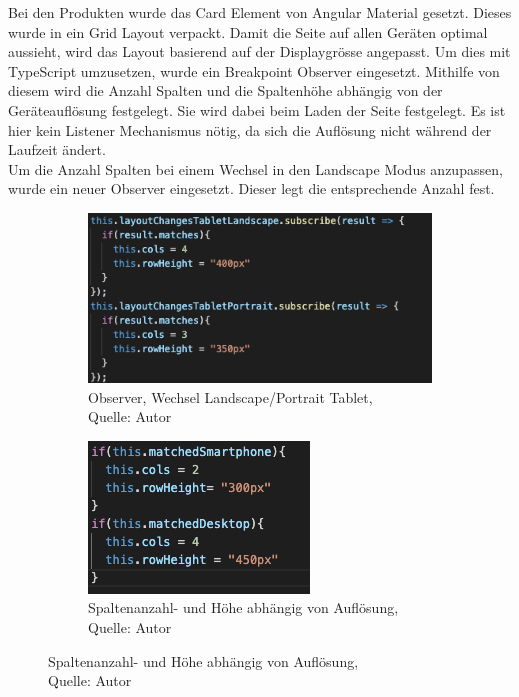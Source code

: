 Bei den Produkten wurde das Card Element von Angular Material gesetzt. Dieses wurde in ein Grid Layout verpackt. Damit die Seite auf allen Geräten optimal aussieht, wird das Layout basierend auf der Displaygrösse angepasst. Um dies mit TypeScript umzusetzen, wurde ein Breakpoint Observer eingesetzt. Mithilfe von diesem wird die Anzahl Spalten und die Spaltenhöhe abhängig von der Geräteauflösung festgelegt. Sie wird dabei beim Laden der Seite festgelegt. Es ist hier kein Listener Mechanismus nötig, da sich die Auflösung nicht während der Laufzeit ändert.\\ Um die Anzahl Spalten bei einem Wechsel in den Landscape Modus anzupassen, wurde ein neuer Observer eingesetzt. Dieser legt die entsprechende Anzahl fest. 
\begin{figure}[h]
	\begin{subfigure}[b]{0.4\textwidth}
		\includegraphics[scale=0.4]{images/rowsLand.PNG}
		\caption[Observer, Wechsel Landscape/Portrait Tablet]{Observer, Wechsel Landscape/Portrait Tablet,\\ Quelle: Autor}
		\label{img: Landscape observer}
	\end{subfigure}
	\hfill
	\begin{subfigure}[b]{0.4\textwidth}
		\includegraphics[scale=0.6]{images/rowsRes.PNG}
		\caption[Spaltenanzahl- und Höhe abhängig von Auflösung]{Spaltenanzahl- und Höhe abhängig von Auflösung,\\ Quelle: Autor}
		\label{img: Resolution Observer}
	\end{subfigure}
\end{figure} 

